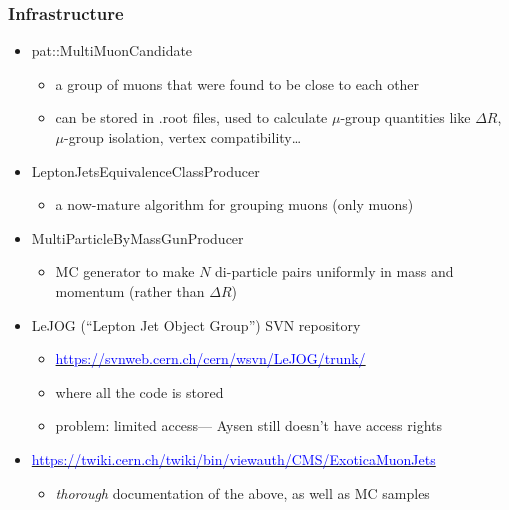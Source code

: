 \documentclass[compress]{beamer}
\begin{document}
\begin{frame}
\frametitle{Infrastructure}
\begin{itemize}
\item pat::MultiMuonCandidate
\begin{itemize}
\item a group of muons that were found to be close to each other
\item can be stored in .root files, used to calculate $\mu$-group quantities like $\Delta R$, $\mu$-group isolation, vertex compatibility\ldots
\end{itemize}
\item LeptonJetsEquivalenceClassProducer
\begin{itemize}
\item a now-mature algorithm for grouping muons (only muons)
\end{itemize}
\item MultiParticleByMassGunProducer
\begin{itemize}
\item MC generator to make $N$ di-particle pairs uniformly in mass and momentum (rather than $\Delta R$)
\end{itemize}
\item LeJOG (``Lepton Jet Object Group'') SVN repository
\begin{itemize}
\item \href{https://svnweb.cern.ch/cern/wsvn/LeJOG/trunk/}{\textcolor{blue}{https://svnweb.cern.ch/cern/wsvn/LeJOG/trunk/}}
\item where all the code is stored
\item problem: limited access--- Aysen still doesn't have access rights
\end{itemize}
\item \href{https://twiki.cern.ch/twiki/bin/viewauth/CMS/ExoticaMuonJets}{\textcolor{blue}{https://twiki.cern.ch/twiki/bin/viewauth/CMS/ExoticaMuonJets}}
\begin{itemize}
\item {\it thorough} documentation of the above, as well as MC samples
\end{itemize}
\end{itemize}
\end{frame}
\end{document}
